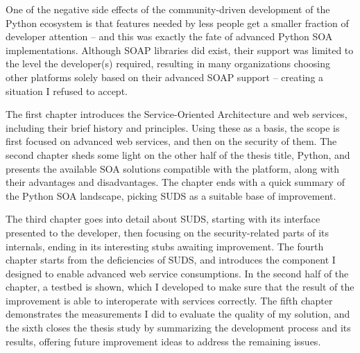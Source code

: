One of the negative side effects of the community-driven development of the Python ecosystem is that features needed by less people get a smaller fraction of developer attention -- and this was exactly the fate of advanced Python SOA implementations. Although SOAP libraries did exist, their support was limited to the level the developer(s) required, resulting in many organizations choosing other platforms solely based on their advanced SOAP support -- creating a situation I refused to accept.

The first chapter introduces the Service-Oriented Architecture and web services, including their brief history and principles. Using these as a basis, the scope is first focused on advanced web services, and then on the security of them. The second chapter sheds some light on the other half of the thesis title, Python, and presents the available SOA solutions compatible with the platform, along with their advantages and disadvantages. The chapter ends with a quick summary of the Python SOA landscape, picking SUDS as a suitable base of improvement.

The third chapter goes into detail about SUDS, starting with its interface presented to the developer, then focusing on the security-related parts of its internals, ending in its interesting stubs awaiting improvement. The fourth chapter starts from the deficiencies of SUDS, and introduces the component I designed to enable advanced web service consumptions. In the second half of the chapter, a testbed is shown, which I developed to make sure that the result of the improvement is able to interoperate with services correctly. The fifth chapter demonstrates the measurements I did to evaluate the quality of my solution, and the sixth closes the thesis study by summarizing the development process and its results, offering future improvement ideas to address the remaining issues.
